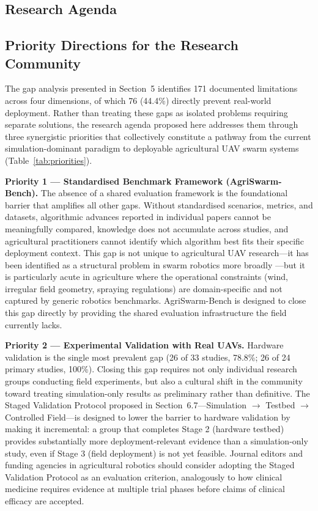 \documentclass[review,3p,times]{elsarticle}
\begin{document}
\begin{itemize}
{%
\section{Research Agenda}

\subsection{Priority Directions for the Research Community}

The gap analysis presented in Section~5 identifies 171 documented limitations across four dimensions, of which 76 (44.4\%) directly prevent real-world deployment. Rather than treating these gaps as isolated problems requiring separate solutions, the research agenda proposed here addresses them through three synergistic priorities that collectively constitute a pathway from the current simulation-dominant paradigm to deployable agricultural UAV swarm systems (Table~\ref{tab:priorities}).

\textbf{Priority 1 --- Standardised Benchmark Framework (AgriSwarm-Bench).} The absence of a shared evaluation framework is the foundational barrier that amplifies all other gaps. Without standardised scenarios, metrics, and datasets, algorithmic advances reported in individual papers cannot be meaningfully compared, knowledge does not accumulate across studies, and agricultural practitioners cannot identify which algorithm best fits their specific deployment context. This gap is not unique to agricultural UAV research---it has been identified as a structural problem in swarm robotics more broadly \cite{brambilla2013}---but it is particularly acute in agriculture where the operational constraints (wind, irregular field geometry, spraying regulations) are domain-specific and not captured by generic robotics benchmarks. AgriSwarm-Bench is designed to close this gap directly by providing the shared evaluation infrastructure the field currently lacks.

\textbf{Priority 2 --- Experimental Validation with Real UAVs.} Hardware validation is the single most prevalent gap (26 of 33 studies, 78.8\%; 26 of 24 primary studies, 100\%). Closing this gap requires not only individual research groups conducting field experiments, but also a cultural shift in the community toward treating simulation-only results as preliminary rather than definitive. The Staged Validation Protocol proposed in Section~6.7---Simulation $\rightarrow$ Testbed $\rightarrow$ Controlled Field---is designed to lower the barrier to hardware validation by making it incremental: a group that completes Stage 2 (hardware testbed) provides substantially more deployment-relevant evidence than a simulation-only study, even if Stage 3 (field deployment) is not yet feasible. Journal editors and funding agencies in agricultural robotics should consider adopting the Staged Validation Protocol as an evaluation criterion, analogously to how clinical medicine requires evidence at multiple trial phases before claims of clinical efficacy are accepted.

}
\end{itemize}
\end{document}
